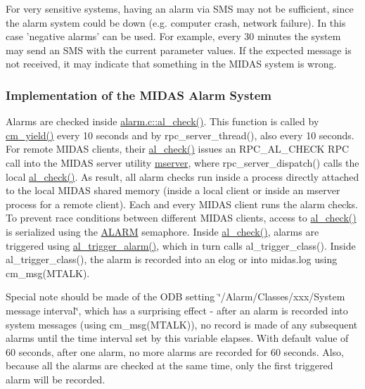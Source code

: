 For very sensitive systems, having an alarm via SMS may not be sufficient, since the alarm system could be down (e.g. computer crash, network failure). In this case 'negative alarms' can be used. For example, every 30 minutes the system may send an SMS with the current parameter values. If the expected message is not received, it may indicate that something in the MIDAS system is wrong.\hypertarget{RC_customize_ODB_RC_ODB_Alarm_system_implementation}{}\subsubsection{Implementation of the MIDAS Alarm System}\label{RC_customize_ODB_RC_ODB_Alarm_system_implementation}
Alarms are checked inside \hyperlink{group__alfunctioncode_gaf31864a8bc5fe779057e81bde12167a9}{alarm.c::al\_\-check()}. This function is called by \hyperlink{group__cmfunctionc_ga115565c5a1d9591fcabf844c1dd624f8}{cm\_\-yield()} every 10 seconds and by rpc\_\-server\_\-thread(), also every 10 seconds. For remote MIDAS clients, their \hyperlink{group__alfunctioncode_gaf31864a8bc5fe779057e81bde12167a9}{al\_\-check()} issues an RPC\_\-AL\_\-CHECK RPC call into the MIDAS server utility \hyperlink{RC_customize_ODB_RC_mserver_utility}{mserver}, where rpc\_\-server\_\-dispatch() calls the local \hyperlink{group__alfunctioncode_gaf31864a8bc5fe779057e81bde12167a9}{al\_\-check()}. As result, all alarm checks run inside a process directly attached to the local MIDAS shared memory (inside a local client or inside an mserver process for a remote client). Each and every MIDAS client runs the alarm checks. To prevent race conditions between different MIDAS clients, access to \hyperlink{group__alfunctioncode_gaf31864a8bc5fe779057e81bde12167a9}{al\_\-check()} is serialized using the \hyperlink{structALARM}{ALARM} semaphore. Inside \hyperlink{group__alfunctioncode_gaf31864a8bc5fe779057e81bde12167a9}{al\_\-check()}, alarms are triggered using \hyperlink{group__alfunctioncode_gac024cd8160dc8b9418f05a63678f6c68}{al\_\-trigger\_\-alarm()}, which in turn calls al\_\-trigger\_\-class(). Inside al\_\-trigger\_\-class(), the alarm is recorded into an elog or into midas.log using cm\_\-msg(MTALK).

Special note should be made of the ODB setting \char`\"{}/Alarm/Classes/xxx/System
message interval\char`\"{}, which has a surprising effect -\/ after an alarm is recorded into system messages (using cm\_\-msg(MTALK)), no record is made of any subsequent alarms until the time interval set by this variable elapses. With default value of 60 seconds, after one alarm, no more alarms are recorded for 60 seconds. Also, because all the alarms are checked at the same time, only the first triggered alarm will be recorded.

